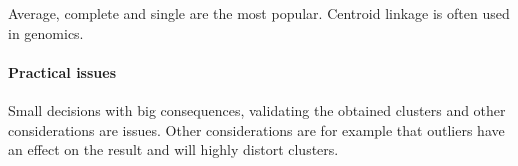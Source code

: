\documentclass[../document.tex]{subfiles}
\begin{document}
	Average, complete and single are the most popular. Centroid linkage is often used in genomics.

	\paragraph{Practical issues}
	Small decisions with big consequences, validating the obtained clusters and other considerations are issues. Other considerations are for example that outliers have an effect on the result and will highly distort clusters.
\end{document}
